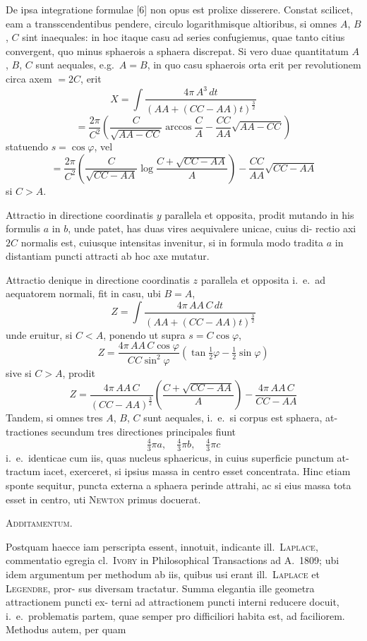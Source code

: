 \documentclass[12pt,a4paper]{article}
\theoremstyle{gauss}
\begin{document}
De ipsa integratione formulae [6] non opus est prolixe disserere. Constat
scilicet, eam a transscendentibus pendere, circulo logarithmisque altioribus, si
omnes $A$, $B$, $C$ sint inaequales: in hoc itaque casu ad series confugiemus, quae
tanto citius convergent, quo minus sphaerois a sphaera discrepat. Si vero duae
quantitatum $A$, $B$, $C$ sunt aequales, e.g.~$A=B$, in quo casu sphaerois orta
erit per revolutionem circa axem $=2C$, erit
\[
X = \int\frac{4\pi\,A^3\,dt}{(AA+(CC-AA)t)^{\frac{3}{2}}}
\]
\[
= \frac{2\pi}{C^2}\left(\frac{C}{\sqrt{AA-CC}}\arccos\frac{C}{A} - \frac{CC}{AA}\sqrt{AA-CC}\right)
\]
statuendo $s = \cos\varphi$, vel
\[
= \frac{2\pi}{C^2}\left(\frac{C}{\sqrt{CC-AA}}\log\frac{C+\sqrt{CC-AA}}{A}\right) - \frac{CC}{AA}\sqrt{CC-AA}
\]
si $C>A$.

Attractio in directione coordinatis $y$ parallela et opposita, prodit mutando
in his formulis $a$ in $b$, unde patet, has duas vires aequivalere unicae, cuius di-
rectio axi $2C$ normalis est, cuiusque intensitas invenitur, si in formula modo
tradita $a$ in distantiam puncti attracti ab hoc axe mutatur.

Attractio denique in directione coordinatis $z$ parallela et opposita i.~e.~ad
aequatorem normali, fit in casu, ubi $B=A$,
\[
Z = \int\frac{4\pi\,AA\,C\,dt}{(AA+(CC-AA)t)^{\frac{3}{2}}}
\]
unde eruitur, si $C<A$, ponendo ut supra $s = C\cos\varphi$,
\[
Z = \frac{4\pi\,AA\,C\cos\varphi}{CC\sin^2\varphi}\left(\tan\tfrac{1}{2}\varphi - \tfrac{1}{2}\sin\varphi\right)
\]
sive si $C>A$, prodit
\[
Z = \frac{4\pi\,AA\,C}{(CC-AA)^{\frac{3}{2}}}\left(\frac{C+\sqrt{CC-AA}}{A}\right) - \frac{4\pi\,AA\,C}{CC-AA}
\]
Tandem, si omnes tres $A$, $B$, $C$ sunt aequales, i.~e.~si corpus est sphaera, at-
tractiones secundum tres directiones principales fiunt
\[
\tfrac{4}{3}\pi a,\quad \tfrac{4}{3}\pi b,\quad \tfrac{4}{3}\pi c
\]
i.~e.~identicae cum iis, quas nucleus sphaericus, in cuius superficie punctum at-
tractum iacet, exerceret, si ipsius massa in centro esset concentrata. Hinc etiam
sponte sequitur, puncta externa a sphaera perinde attrahi, ac si eius massa tota
esset in centro, uti \textsc{Newton} primus docuerat.

\vspace{12pt}
\begin{center}
\textsc{Additamentum.}
\end{center}

Postquam haecce iam perscripta essent, innotuit, indicante ill.~\textsc{Laplace},
commentatio egregia cl.~\textsc{Ivory} in Philosophical Transactions ad A.~1809; ubi idem
argumentum per methodum ab iis, quibus usi erant ill.~\textsc{Laplace} et \textsc{Legendre}, pror-
sus diversam tractatur. Summa elegantia ille geometra attractionem puncti ex-
terni ad attractionem puncti interni reducere docuit, i.~e.~problematis partem,
quae semper pro difficiliori habita est, ad faciliorem. Methodus autem, per quam
\end{document}
